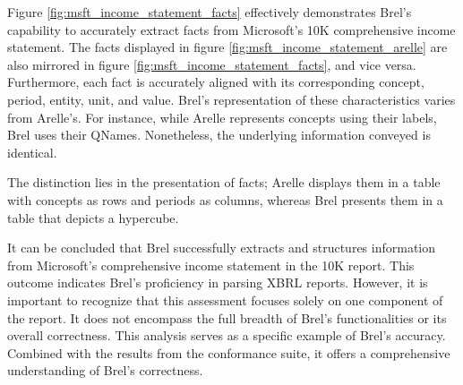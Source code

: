 

Figure \ref{fig:msft_income_statement_facts} effectively demonstrates Brel's capability to accurately extract facts from Microsoft's 10K comprehensive income statement.  
The facts displayed in figure \ref{fig:msft_income_statement_arelle} are also mirrored in figure \ref{fig:msft_income_statement_facts}, and vice versa.  
Furthermore, each fact is accurately aligned with its corresponding concept, period, entity, unit, and value.  
Brel's representation of these characteristics varies from Arelle's.  
For instance, while Arelle represents concepts using their labels, Brel uses their QNames.  
Nonetheless, the underlying information conveyed is identical.

The distinction lies in the presentation of facts; Arelle displays them in a table with concepts as rows and periods as columns,  
whereas Brel presents them in a table that depicts a hypercube.

It can be concluded that Brel successfully extracts and structures information from Microsoft's comprehensive income statement in the 10K report.  
This outcome indicates Brel's proficiency in parsing XBRL reports.
However, it is important to recognize that this assessment focuses solely on one component of the report.  
It does not encompass the full breadth of Brel's functionalities or its overall correctness.  
This analysis serves as a specific example of Brel's accuracy.  
Combined with the results from the conformance suite, it offers a comprehensive understanding of Brel's correctness.
